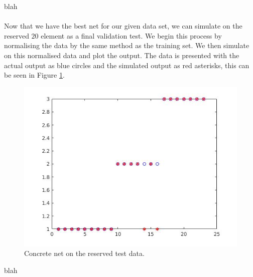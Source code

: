 \documentclass{article}%
\begin{document}
blah
\\
\\
Now that we have the best net for our given data set, we can simulate on the reserved $20$ element as a final validation test. We begin this process by normalising the data by the same method as the training set. We then simulate on this normalised data and plot the output. The data is presented with the actual output as blue circles and the simulated output as red asterisks, this can be seen in Figure \ref{fig:contest}.
\begin{figure}[H]
\centering
\includegraphics[scale=0.5]{Images/seedtest.jpg}
\caption{Concrete net on the reserved test data.}
\label{fig:contest}
\end{figure}
blah
\end{document}
